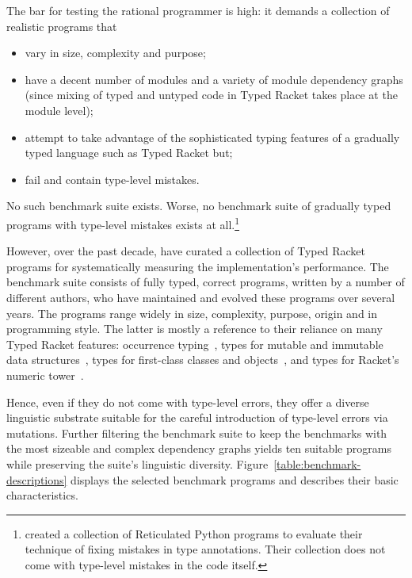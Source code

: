 
The bar for testing the rational programmer is high: it demands a
collection of realistic programs that
\begin{itemize}
   
  \item vary in size, complexity and purpose; 
    
  \item  have a decent number of modules and a variety of module
    dependency graphs (since mixing of typed and untyped code in Typed
    Racket takes place at the module level);  

  \item attempt to take  advantage of the sophisticated typing features of
    a gradually typed language such as Typed Racket but;

   \item  fail and contain type-level mistakes. 
\end{itemize}

No such benchmark suite exists.  Worse, no benchmark suite of
gradually typed programs with type-level mistakes exists at
all.\footnote{\citet{cc-oopsla-20} created a collection of Reticulated
Python programs to evaluate their technique of fixing mistakes in type
annotations. Their collection does not come with type-level mistakes
in the code itself.} 


However, over the past decade,  \citet{gtnffvf-jfp-2019} have curated a
collection of Typed Racket programs for systematically measuring the
implementation's performance. The benchmark suite consists of fully typed,
correct programs, written by a number of different authors, who have
maintained and evolved these programs over several years. The programs
range widely in size, complexity, purpose, origin and in programming
style. The latter is mostly a reference to their reliance on many Typed
Racket features: occurrence typing~\cite{tf-icfp-2010}, types for mutable
and immutable data structures~\cite{hpst-sfp-2010}, types for first-class
classes and objects~\cite{tsdtf-oopsla-2012}, and types for Racket's
numeric tower~\cite{stathff-padl-12}. 


Hence, even if they do not come with type-level errors, they offer a
diverse linguistic substrate suitable for the careful introduction of
type-level errors via mutations. Further filtering the benchmark suite to
keep the benchmarks with the most sizeable and complex dependency graphs
yields ten suitable programs while preserving the suite's linguistic
diversity. Figure~\ref{table:benchmark-descriptions} displays the selected
benchmark programs and describes their basic characteristics.
